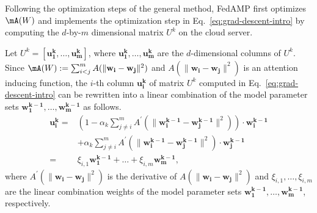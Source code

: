 
Following the optimization steps of the general method, FedAMP first optimizes $\mA(W)$ and implements the optimization step in Eq.~\eqref{eq:grad-descent-intro} by computing the $d$-by-$m$ dimensional matrix $U^k$ on the cloud server.

Let $U^k=[\mathbf{u_1^k}, \ldots, \mathbf{u_m^k}]$, where $\mathbf{u_1^k}, \ldots, \mathbf{u_m^k}$ are the $d$-dimensional columns of $U^k$.
Since $\mA(W):=\sum_{i<j}^m A(\|\mathbf{w_i} - \mathbf{w_j}\|^2)$ and $A(\|\mathbf{w_i} - \mathbf{w_j}\|^2)$ is an attention inducing function, the $i$-th column $\mathbf{u_i^k}$ of matrix $U^k$ computed in Eq.~\eqref{eq:grad-descent-intro} can be rewritten into a linear combination of the model parameter sets $\mathbf{w_1^{k-1}}, \ldots, \mathbf{w_m^{k-1}}$ as follows.
\begin{equation}
\begin{aligned}
\label{eq:grad-step-eq}
\mathbf{u_i^k} =& \left(1 - \alpha_k\sum_{j\neq i}^m A^\prime\left(\|\mathbf{w_i^{k-1}} - \mathbf{w_j^{k-1}}\|^2\right)\right)\cdot \mathbf{w_i^{k-1}} \\ 
&  + \alpha_k \sum_{j\neq i}^m A^\prime\left(\|\mathbf{w_i^{k-1}} - \mathbf{w_j^{k-1}}\|^2\right)\cdot \mathbf{w_j^{k-1}} \\
=& \xi_{i,1}\mathbf{w_1^{k-1}} + \dots + \xi_{i,m}\mathbf{w_m^{k-1}},
\end{aligned}
\end{equation}
where $A^\prime(\|\mathbf{w_i} - \mathbf{w_j}\|^2)$ is the derivative of $A(\|\mathbf{w_i} - \mathbf{w_j}\|^2)$ and $\xi_{i,1}, \ldots, \xi_{i,m}$ are the linear combination weights of the model parameter sets $\mathbf{w_1^{k-1}}, \ldots, \mathbf{w_m^{k-1}}$, respectively.





